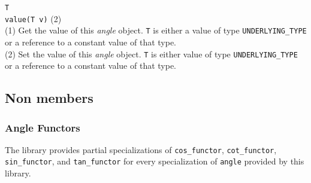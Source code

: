 \documentclass[oneside]{report}
\begin{document}
\noindent\texttt{T}\\
\texttt{value(T v)} (2)\\

\noindent{}(1) Get the value of this \textit{angle} object. \texttt{T} is either a value of type
\texttt{UNDERLYING\_TYPE} or a reference to a constant value of that type.\\

\noindent{}(2) Set the value of this \textit{angle} object. \texttt{T} is either value of type
\texttt{UNDERLYING\_TYPE} or a reference to a constant value of that type.\\

\subsection{Non members}
\subsubsection{Angle Functors}
The library provides partial specializations of \texttt{cos\_functor}, \texttt{cot\_functor},
\texttt{sin\_functor}, and \texttt{tan\_functor} for every specialization of \texttt{angle}
provided by this library.

\end{document}
